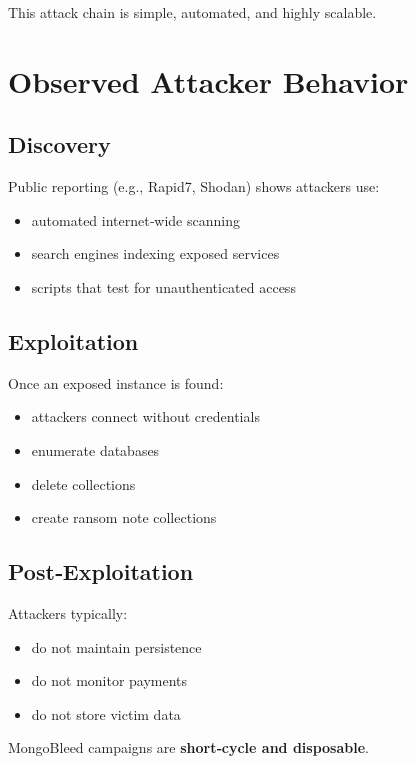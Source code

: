 \documentclass[12pt]{article}
\begin{document}
	This attack chain is simple, automated, and highly scalable.
	
	\section{Observed Attacker Behavior}
	
	\subsection*{Discovery}
	Public reporting (e.g., Rapid7, Shodan) shows attackers use:
	
	\begin{itemize}
		\item automated internet‑wide scanning  
		\item search engines indexing exposed services  
		\item scripts that test for unauthenticated access  
	\end{itemize}
	
	\subsection*{Exploitation}
	Once an exposed instance is found:
	
	\begin{itemize}
		\item attackers connect without credentials  
		\item enumerate databases  
		\item delete collections  
		\item create ransom note collections  
	\end{itemize}
	
	\subsection*{Post‑Exploitation}
	Attackers typically:
	
	\begin{itemize}
		\item do not maintain persistence  
		\item do not monitor payments  
		\item do not store victim data  
	\end{itemize}
	
	MongoBleed campaigns are \textbf{short‑cycle and disposable}.
	
\end{document}
